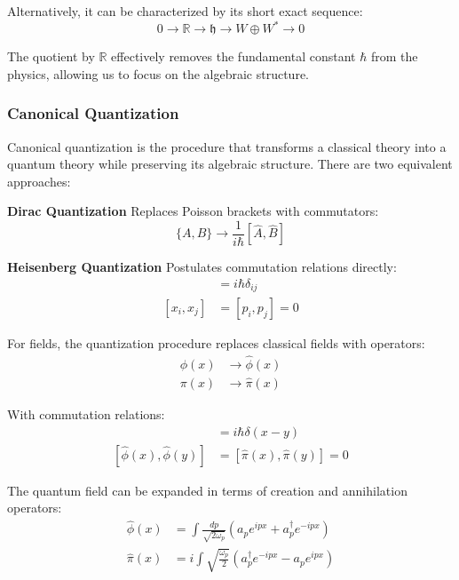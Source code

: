 Alternatively, it can be characterized by its short exact sequence:
\begin{equation}
0 \longrightarrow \mathbb{R} \longrightarrow \mathfrak{h} \longrightarrow W\oplus W^* \longrightarrow 0
\end{equation}

The quotient by $\mathbb{R}$ effectively removes the fundamental constant $\hbar$ from the physics, allowing us to focus on the algebraic structure.

\subsubsection{Canonical Quantization}

Canonical quantization is the procedure that transforms a classical theory into a quantum theory while preserving its algebraic structure. There are two equivalent approaches:

\textbf{Dirac Quantization}
Replaces Poisson brackets with commutators:
\begin{equation}
\{A, B\} \rightarrow \frac{1}{i\hbar}[\hat{A}, \hat{B}]
\end{equation}

\textbf{Heisenberg Quantization}
Postulates commutation relations directly:
\begin{align}
[x_i, p_j] &= i\hbar\delta_{ij} \\
[x_i, x_j] &= [p_i, p_j] = 0
\end{align}

For fields, the quantization procedure replaces classical fields with operators:
\begin{align}
\phi(x) &\rightarrow \hat{\phi}(x) \\
\pi(x) &\rightarrow \hat{\pi}(x)
\end{align}

With commutation relations:
\begin{align}
[\hat{\phi}(x), \hat{\pi}(y)] &= i\hbar\delta(x-y) \\
[\hat{\phi}(x), \hat{\phi}(y)] &= [\hat{\pi}(x), \hat{\pi}(y)] = 0
\end{align}

The quantum field can be expanded in terms of creation and annihilation operators:
\begin{align}
\hat{\phi}(x) &= \int \frac{dp}{\sqrt{2\omega_p}} (a_p e^{ipx} + a_p^\dagger e^{-ipx}) \\
\hat{\pi}(x) &= i\int \sqrt{\frac{\omega_p}{2}} (a_p^\dagger e^{-ipx} - a_p e^{ipx})
\end{align}

